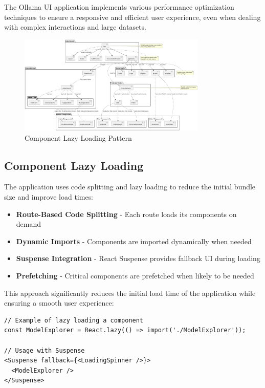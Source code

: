 The Ollama UI application implements various performance optimization techniques to ensure a responsive and efficient user experience, even when dealing with complex interactions and large datasets.

\begin{figure}[h]
    \centering
    \includegraphics[width=0.8\textwidth]{./Chapter07/figures/component_lazy_loading.png}
    \caption{Component Lazy Loading Pattern}
    \label{fig:component-lazy-loading}
\end{figure}

\subsection{Component Lazy Loading}

The application uses code splitting and lazy loading to reduce the initial bundle size and improve load times:

\begin{itemize}
  \item \textbf{Route-Based Code Splitting} - Each route loads its components on demand
  \item \textbf{Dynamic Imports} - Components are imported dynamically when needed
  \item \textbf{Suspense Integration} - React Suspense provides fallback UI during loading
  \item \textbf{Prefetching} - Critical components are prefetched when likely to be needed
\end{itemize}

This approach significantly reduces the initial load time of the application while ensuring a smooth user experience:

\begin{verbatim}
// Example of lazy loading a component
const ModelExplorer = React.lazy(() => import('./ModelExplorer'));

// Usage with Suspense
<Suspense fallback={<LoadingSpinner />}>
  <ModelExplorer />
</Suspense>
\end{verbatim}

